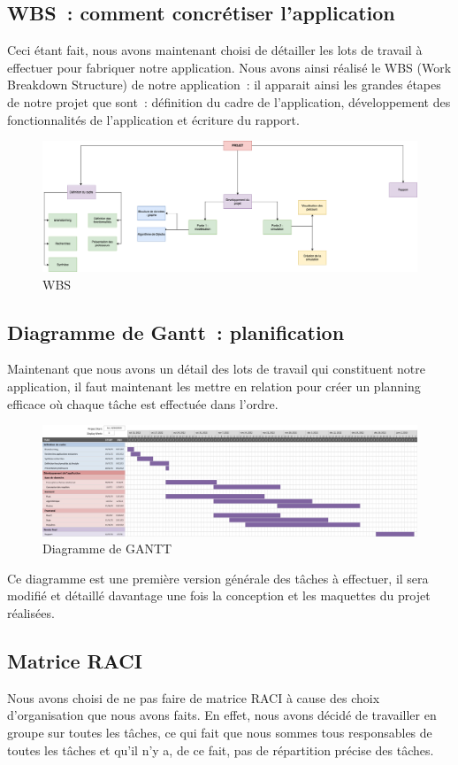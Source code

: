 \documentclass[french,a4paper]{article}
\begin{document}
\subsection{WBS~: comment concrétiser l’application}
Ceci étant fait, nous avons maintenant choisi de détailler les lots de travail à effectuer pour fabriquer notre application. Nous avons ainsi réalisé le WBS (Work Breakdown Structure) de notre application~: il apparait ainsi les grandes étapes de notre projet que sont~: définition du cadre de l’application, développement des fonctionnalités de l’application et écriture du rapport.
\begin{figure}[H]
    \centering
    \includegraphics[width=1\textwidth]{img/WBS.png}
    \caption{WBS}
\end{figure}

\subsection{Diagramme de Gantt~: planification}
Maintenant que nous avons un détail des lots de travail qui constituent notre application, il faut maintenant les mettre en relation pour créer un planning efficace où chaque tâche est effectuée dans l’ordre.
\begin{figure}[H]
    \centering
    \includegraphics[width=1\textwidth]{img/gantt.png}
    \caption{Diagramme de GANTT}
\end{figure}
Ce diagramme est une première version générale des tâches à effectuer, il sera modifié et détaillé davantage une fois la conception et les maquettes du projet réalisées.

\subsection{Matrice RACI}
Nous avons choisi de ne pas faire de matrice RACI à cause des choix d'organisation que nous avons faits. En effet, 
nous avons décidé de travailler en groupe sur toutes les tâches, ce qui fait que nous sommes tous responsables de toutes les tâches et qu'il n'y a, de ce fait, 
pas de répartition précise des tâches.
\end{document}
